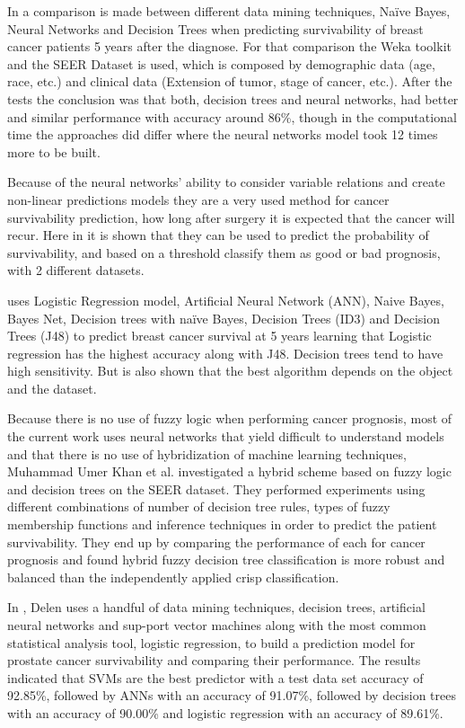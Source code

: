 In \cite{Bellaachia2006} a comparison is made between different data mining techniques, Naïve Bayes, Neural Networks and Decision Trees 
when predicting survivability of breast cancer patients 5 years after the diagnose. For that comparison the Weka toolkit and the SEER 
Dataset is used, which is composed by demographic data (age, race, etc.) and clinical data (Extension of tumor, stage of cancer, etc.). 
After the tests the conclusion was that both, decision trees and neural networks, had better and similar performance with accuracy around 86\%, 
though in the computational time the approaches did differ where the neural networks model took 12 times more to be built.

Because of the neural networks’ ability to consider variable relations and create non-linear predictions models they are a very used 
method for cancer survivability prediction, how long after surgery it is expected that the cancer will recur. Here in \cite{Chi2007} it 
is shown that they can be used to predict the probability of survivability, and based on a threshold classify them as good or bad prognosis,
 with 2 different datasets. 

 \cite{Endo2008} uses Logistic Regression model, Artificial Neural Network (ANN), Naive Bayes, Bayes Net, Decision trees with naïve Bayes,
 Decision Trees (ID3) and Decision Trees (J48) to predict breast cancer survival at 5 years learning that Logistic regression has the 
 highest accuracy along with J48. Decision trees tend to have high sensitivity. But is also shown that the best algorithm depends on the object
 and the dataset.

Because there is no use of fuzzy logic when performing cancer prognosis, most of the current work uses neural networks that yield difficult
 to understand models and that there is no use of hybridization of machine learning techniques, Muhammad Umer Khan et al. investigated a hybrid
 scheme based on fuzzy logic and decision trees on the SEER dataset. They performed experiments using different combinations of number of 
 decision tree rules, types of fuzzy membership functions and inference techniques in order to predict the patient survivability. They end up
 by comparing the performance of each for cancer prognosis and found hybrid fuzzy decision tree classification is more robust and balanced
 than the independently applied crisp classification. \cite{Khan2008}

In \cite{Delen2009}, Delen uses a handful of data mining techniques, decision trees, artificial neural networks and sup-port vector machines
 along with the most common statistical analysis tool, logistic regression, to build a prediction model for prostate cancer survivability and 
 comparing their performance. The results indicated that SVMs are the best predictor with a test data set accuracy of 92.85\%, followed by ANNs 
 with an accuracy of 91.07\%, followed by decision trees with an accuracy of 90.00\% and logistic regression with an accuracy of 89.61\%.

